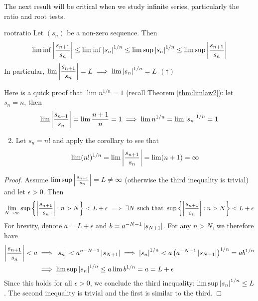 The next result will be critical when we study infinite series, particularly the ratio and root tests.

\begin{thm}{}{rootratio}
	Let $(s_n)$ be a non-zero sequence. Then
	\[\liminf\left| \frac{s_{n+1}}{s_n}\right|\le\liminf\left| s_n\right|^{1/n}\le\limsup\left| s_n\right|^{1/n}\le \limsup\left| \frac{s_{n+1}}{s_n}\right|\]
	In particular, $\displaystyle\lim\left| \frac{s_{n+1}}{s_n}\right|=L\implies \lim\left| s_n\right|^{1/n}=L$ \hfill$(\dag)$
\end{thm}


\begin{examples}{}{}
	\exstart Here is a quick proof that $\lim n^{1/n}=1$ (recall Theorem \ref{thm:limlaw2}): let $s_n=n$, then
  \[\lim\left| \frac{s_{n+1}}{s_n}\right|=\lim\frac{n+1}n=1\implies \lim n^{1/n}=\lim\left| s_n\right|^{1/n}=1\]
\begin{enumerate}\setcounter{enumi}{1}
  \item Let $s_n=n!$ and apply the corollary to see that
  \[\lim(n!)^{1/n}=\lim\left| \frac{s_{n+1}}{s_n}\right|=\lim(n+1)=\infty\]
\end{enumerate}


\begin{proof}
% 	
	Assume $\limsup\left| \frac{s_{n+1}}{s_n}\right|=L\neq \infty$ (otherwise the third inequality is trivial) and let $\epsilon>0$. Then
	\[
		\lim_{N\to\infty}\sup\left\{\left| \frac{s_{n+1}}{s_n}\right|:n>N\right\}<L+\epsilon\implies\exists 
		N\text{ such that }\sup\left\{\left| \frac{s_{n+1}}{s_n}\right|:n>N\right\}<L+\epsilon
	\]
	For brevity, denote $a=L+\epsilon$ and $b=a^{-N-1}\left| s_{N+1}\right|$. For any $n>N$, we therefore have
	\begin{align*}
		\left| \frac{s_{n+1}}{s_n}\right|<a&\implies \left| s_n\right|< a^{n-N-1}\left| s_{N+1}\right| \implies \left| s_n\right|^{1/n}< a\left(a^{-N-1}\left| s_{N+1}\right|\right)^{1/n} =ab^{1/n}\\
		&\implies \limsup\left| s_n\right|^{1/n}\le a\lim b^{1/n}=a=L+\epsilon
	\end{align*}
	Since this holds for all $\epsilon>0$, we conclude the third  inequality: $\limsup\left| s_n\right|^{1/n}\le L$.\smallbreak
	The second inequality is trivial and the first is similar to the third.
\end{proof}
\end{examples}

